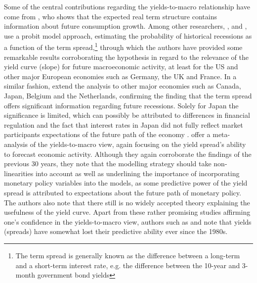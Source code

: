 Some of the central contributions regarding the yields-to-macro relationship have come from \citet{harvey1988real}, who shows that the expected real term structure contains information about future consumption growth.
Among other researchers, \citet{estrella1991term}, \citet{estrella1995term} and \citet{estrella1996yield}, use a probit model approach, estimating the probability of historical recessions as a function of the term spread,\footnote{The term spread is generally known as the difference between a long-term and a short-term interest rate, e.g. the difference between the 10-year and 3-month government bond yields} through which the authors have provided some remarkable results corroborating the hypothesis in regard to the relevance of the yield curve (slope) for future macroeconomic activity, at least for the US and other major European economies such as Germany, the UK and France.
In a similar fashion, \citet{bernard1996} extend the analysis to other major economies such as Canada, Japan, Belgium and the Netherlands, confirming the finding that the term spread offers significant information regarding future recessions. 
Solely for Japan the significance is limited, which can possibly be attributed to differences in financial regulation and the fact that interest rates in Japan did not fully reflect market participants expectations of the future path of the economy \citep{bernard1996}. 
\citet{evgenidis2018yield} offer a meta-analysis of the yields-to-macro view, again focusing on the yield spread's ability to forecast economic activity. Although they again corroborate the findings of the previous 30 years, they note that the modelling strategy should take non-linearities into account as well as underlining the importance of incorporating monetary policy variables into the models, as some predictive power of the yield spread is attributed to expectations about the future path of monetary policy. The authors also note that there still is no widely accepted theory explaining the usefulness of the yield curve. 
Apart from these rather promising studies affirming one's confidence in the yields-to-macro view, authors such as \citet{dotsey1998predictive} and \citet{stock2001vector} note that yields (spreads) have somewhat lost their predictive ability ever since the 1980s. 

